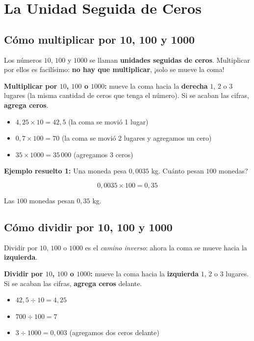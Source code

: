 \documentclass[12pt, letterpaper]{article}
\begin{document}
\section{La Unidad Seguida de Ceros}

\subsection{Cómo multiplicar por 10, 100 y 1000}

Los números $10$, $100$ y $1000$ se llaman \textbf{unidades seguidas de ceros}. Multiplicar por ellos es facilísimo: \textbf{no hay que multiplicar}, ¡solo se mueve la coma!

\begin{cuadrosolucion}
  \textbf{Multiplicar por $10$, $100$ o $1000$:} mueve la coma hacia la \textbf{derecha} $1$, $2$ o $3$ lugares (la misma cantidad de ceros que tenga el número). Si se acaban las cifras, \textbf{agrega ceros}.
  \begin{itemize}
    \item $4{,}25 \times 10 = 42{,}5$ (la coma se movió 1 lugar)
    \item $0{,}7 \times 100 = 70$ (la coma se movió 2 lugares y agregamos un cero)
    \item $35 \times 1000 = 35\,000$ (agregamos 3 ceros)
  \end{itemize}
\end{cuadrosolucion}

\noindent\textbf{Ejemplo resuelto 1:} Una moneda pesa $0{,}0035$ kg. \textquestiondown Cuánto pesan $100$ monedas?

\[
  0{,}0035 \times 100 = 0{,}35
\]

\noindent Las $100$ monedas pesan $0{,}35$ kg.
\newpage
\subsection{Cómo dividir por 10, 100 y 1000}
Dividir por $10$, $100$ o $1000$ es el \emph{camino inverso}: ahora la coma se mueve hacia la \textbf{izquierda}.

\begin{cuadroteoria}
  \textbf{Dividir por $10$, $100$ o $1000$:} mueve la coma hacia la \textbf{izquierda} $1$, $2$ o $3$ lugares. Si se acaban las cifras, \textbf{agrega ceros} delante.
  \begin{itemize}
    \item $42{,}5 \div 10 = 4{,}25$
    \item $700 \div 100 = 7$
    \item $3 \div 1000 = 0{,}003$ (agregamos dos ceros delante)
  \end{itemize}
\end{cuadroteoria}
\end{document}
